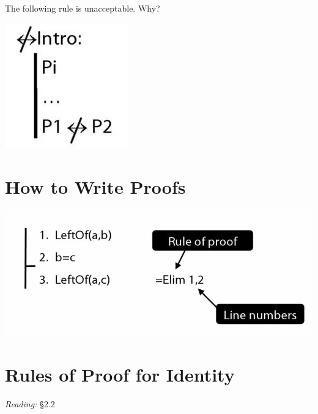 \documentclass[12pt]{extarticle}
\begin{document}
\begin{multicols*}{3}
\begin{minipage}{\columnwidth}
 
The following rule is unacceptable. Why?
 
\begin{center}
\includegraphics[scale=0.3]{img/rule_not_equivalent_intro_wrong.png}
\end{center}
\end{minipage}
 
 
 
\section{How to Write Proofs}
 
\begin{center}
\includegraphics[scale=0.3]{img/how_to_write_proofs.png}
\end{center}
 
\begin{minipage} {\columnwidth}
\section{Rules of Proof for Identity}
 
\emph{Reading:} §2.2
 

\end{minipage}
\end{multicols*}
\end{document}
